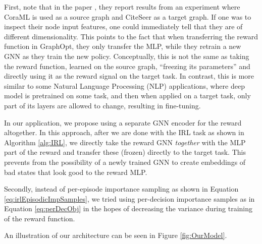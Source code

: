 \documentclass{report}
\numberwithin{equation}{section}
\numberwithin{figure}{section}
\numberwithin{table}{section}
\numberwithin{algorithm}{section}
\begin{document}
First, note that in the paper \cite{GraphOpt}, they report 
results from an experiment where 
CoraML \citep{Cora} is used as a source graph 
and CiteSeer \citep{CiteSeer} as a target graph. If 
one was to inspect their node input features, one could 
immediately tell that they are of different dimensionality.
This points to the fact that when transferring the reward 
function in GraphOpt, they only transfer the MLP, while they 
retrain a new GNN as they train the new policy. Conceptually, 
this is not the same as taking the reward function, learned on 
the source graph, ``freezing its parameters'' and directly 
using it as the reward signal on the target task. In contrast,
this is more similar to some Natural Language Processing (NLP) 
applications, where deep model is pretrained on some task, and 
then when applied on a target task, only part of its layers are 
allowed to change, resulting in fine-tuning.

In our application, we propose using a separate GNN encoder for 
the reward altogether. In this approach, after we are done with 
the IRL task as shown in Algorithm \ref{alg:IRL}, we directly 
take the reward GNN \textit{together} with the MLP part of the 
reward and transfer these (frozen) directly to the target task. 
This prevents from the possibility of a newly trained 
GNN to create embeddings of bad states that look good to the 
reward MLP.

Secondly, instead of per-episode importance sampling as 
shown in Equation \ref{eq:irlEpisodicImpSamples}, we tried 
using per-decision importance samples as in 
Equation \ref{eq:perDecObj} in the hopes of decreasing the 
variance during training of the reward function.

An illustration of our architecture can be seen in 
Figure \ref{fig:OurModel}.
\end{document}
